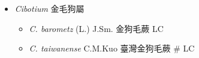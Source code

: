 
  \begin{itemize}
 \item[] \textit{Cibotium} 金毛狗屬
                                
  \begin{itemize}
        \item[] \textit{C. barometz} (L.) J.Sm.  金狗毛蕨   LC
        \item[] \textit{C. taiwanense} C.M.Kuo  臺灣金狗毛蕨  \# LC
  \end{itemize}
  \end{itemize}
